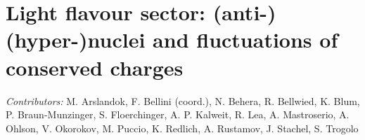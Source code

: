 \documentclass[../report.tex]{subfiles}
\providecommand{\main}{..}
\begin{document}
\newpage
\section{Light flavour sector: (anti-)(hyper-)nuclei and fluctuations of conserved charges}

\textit{Contributors:} M. Arslandok, F. Bellini (coord.), N. Behera, R. Bellwied, K. Blum, P. Braun-Munzinger, S. Floerchinger, A. P. Kalweit, R. Lea, A. Mastroserio, A. Ohlson, V. Okorokov, M. Puccio,  K. Redlich, A. Rustamov, J. Stachel, S. Trogolo






\end{document}
